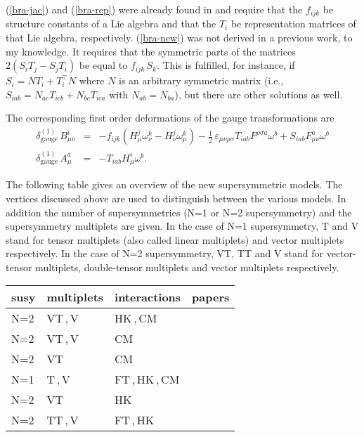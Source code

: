 \documentclass[a4paper,12pt]{article}
\begin{document}
(\ref{bra-jac}) and (\ref{bra-rep}) were already found
in \cite{bra-HK1} and require that
the $f_{ijk}$ be structure
constants of a Lie algebra and that the $T_i$ be representation
matrices of that Lie algebra, respectively. 
(\ref{bra-new}) was not derived in a previous work, to my knowledge.
It requires that the symmetric parts of the matrices
$2(S_i T_j-S_j T_i)$ be equal to $f_{ijk}\,S_k$. This is fulfilled,
for instance, if $S_i=N T_i+T_i^\top N$ where $N$ is an arbitrary
symmetric matrix (i.e.,
$S_{iab}=N_{ac}T_{icb}+N_{bc}T_{ica}$ with
$N_{ab}=N_{ba}$), but there are other solutions as well.

The corresponding first order deformations of the gauge transformations
are
\begin{eqnarray}
\delta^{(1)}_\mathrm{gauge}\, B_{\mu\nu}^i &=&
-f_{ijk} (H_\mu^j \omega^k_\nu-H_\nu^j \omega^k_\mu)
-\frac 12\, \varepsilon_{\mu\nu\rho\sigma} T_{iab} F^{\rho\sigma a}\omega^b
+S_{iab} F^a_{\mu\nu} \omega^b
\nonumber\\
\delta^{(1)}_\mathrm{gauge}\, A_\mu^a &=& - T_{iab} H_\mu^i \omega^b.
\end{eqnarray} 

The following table gives an overview of the new supersymmetric
models. The vertices discussed above are used to distinguish
between the various models. In addition the number of supersymmetries
(N=1 or N=2 supersymmetry) and the supersymmetry multiplets
are given. In the case of N=1 supersymmetry, T and V stand for 
tensor multiplets (also called linear multiplets) 
and vector multiplets
respectively. 
In the case of N=2 supersymmetry, VT, TT and V stand for
vector-tensor multiplets, double-tensor multiplets
and vector multiplets respectively.
\medskip

\begin{tabular}{l|l|l|l}
susy & multiplets & interactions & papers\\ 
\hline\rule{0em}{2.5ex}
N=2 & {VT}\,,\,{V} & {HK}\,,\,{CM} & 
\cite{bra-1,bra-2,bra-7,bra-8,bra-10}\\
\hline\rule{0em}{2.5ex}
N=2 & {VT}\,,\,{V} & {CM} & 
\cite{bra-3,bra-4,bra-5,bra-9}\\
\hline\rule{0em}{2.5ex}
N=2 & {VT} & {CM} & \cite{bra-6}\\
\hline\rule{0em}{2.5ex}
N=1 & {T}\,,\,{V} & 
{FT}\,,\,{HK}\,,\,{CM} & \cite{bra-11}\\
\hline\rule{0em}{2.5ex}
N=2 & {VT} & {HK} & \cite{bra-12}\\
\hline\rule{0em}{2.5ex}
N=2 & {TT}\,,\,{V} & {FT}\,,\,{HK} & \cite{bra-13}
\end{tabular}
\medskip
\end{document}
